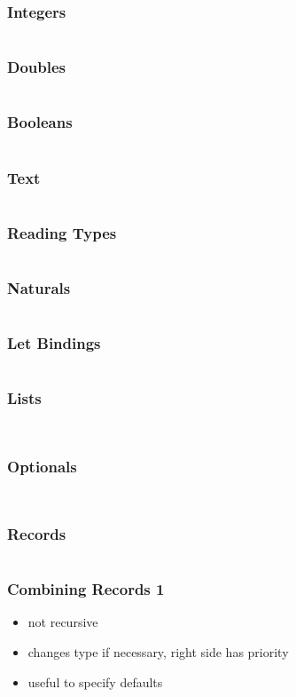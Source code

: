 \documentclass{beamer}
\begin{document}
\begin{frame}[fragile]
  \frametitle{Integers}
  \inputminted{text}{static-source/ints.out}
\end{frame}

\begin{frame}[fragile]
  \frametitle{Doubles}
  \inputminted{text}{static-source/doubles.out}
\end{frame}

\begin{frame}[fragile]
  \frametitle{Booleans}
  \inputminted{text}{static-source/bools.out}
\end{frame}

\begin{frame}[fragile]
  \frametitle{Text}
  \inputminted{text}{static-source/texts.out}
\end{frame}

\begin{frame}[fragile]
  \frametitle{Reading Types}
  \inputminted{text}{static-source/types.out}
\end{frame}

\begin{frame}[fragile]
  \frametitle{Naturals}
  \inputminted{text}{static-source/nats.out}
\end{frame}

\begin{frame}[fragile]
  \frametitle{Let Bindings}
  \inputminted{text}{dhall/lets.dhall}
\end{frame}

\begin{frame}[fragile]
  \frametitle{Lists}
  \inputminted{text}{static-source/lists.out}
  \inputminted{text}{dhall/list-fold.dhall}
\end{frame}

\begin{frame}[fragile]
  \frametitle{Optionals}
  \inputminted[fontsize=\footnotesize]{text}{static-source/optionals.out}
  \inputminted[fontsize=\footnotesize]{text}{dhall/optional-fold.dhall}
\end{frame}

\begin{frame}[fragile]
  \frametitle{Records}
  \inputminted{text}{static-source/records.out}
\end{frame}

\begin{frame}[fragile]
  \frametitle{Combining Records 1}
  \begin{itemize}
  \item not recursive
  \item changes type if necessary, right side has priority
  \item useful to specify defaults
  \end{itemize}
  \inputminted{text}{static-source/records-combine1.out}
\end{frame}
\end{document}
